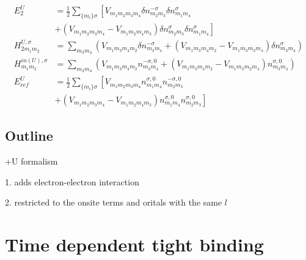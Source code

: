 %
\begin{equation}
\begin{split}
E_{2}^{U}&=\frac{1}{2}\sum_{\{m_i\}\sigma}\left [V_{m_1m_2m_3m_4}\delta n_{m_2m_3}^{-\sigma}\delta n_{m_1m_4}^{\sigma}\right. \\&\left.+
(V_{m_1m_2m_3m_4}-V_{m_1m_2m_4m_3})
\delta n_{m_2m_3}^{\sigma}\delta n_{m_1m_4}^{\sigma}\right]\\
H^{U,\sigma}_{2m_1m_2}&=\sum_{m_3m_4}(V_{m_1m_3m_4m_2}
\delta n_{m_3m_4}^{-\sigma}+(V_{m_1m_3m_4m_2}-V_{m_1m_3m_2m_4})\delta n_{m_3m_4}^{\sigma})\\
H^{in(U), \sigma}_{m_1m_2}&=\sum_{m_3m_4}(V_{m_1m_3m_4m_2}
n_{m_3m_4}^{-\sigma,0}+(V_{m_1m_3m_4m_2}-V_{m_1m_3m_2m_4})n_{m_3m_4}^{\sigma,0})\\
E^{U}_{ref}&=\frac{1}{2}\sum_{\{m_i\}\sigma}\left[V_{m_1m_2m_3m_4}n_{m_1m_4}^{\sigma, 0}n_{m_2m_3}^{-\sigma,0}\right. \\ &\left.+(V_{m_1m_2m_3m_4}-V_{m_1m_2m_4m_3})
n_{m_1m_4}^{\sigma, 0}n_{m_2m_3}^{\sigma,0}\right]
\end{split}
\end{equation}
%
\subsection{Outline}
+U formalism
\par{1. adds electron-electron interaction}
\par{2. restricted to the onsite terms and oritals with the same $l$}
\section{Time dependent tight binding}
